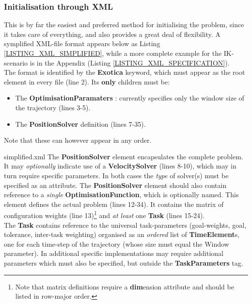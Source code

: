 \documentclass[12pt,a4paper,onecolumn]{article}
\begin{document}
\subsubsection*{Initialisation through XML}
This is by far the easiest and preferred method for initialising the problem, since it takes care of everything, and also provides a great deal of flexibility. A symplified XML-file format appears below as Listing \ref{LISTING_XML_SIMPLIFIED}, while a more complete example for the IK-scenario is in the Appendix (Listing \ref{LISTING_XML_SPECIFICATION}).\\
\newline
\noindent The format is identified by the \textbf{Exotica} keyword, which must appear as the root element in every file (line 2). Its \textbf{only} children must be:
\begin{itemize}
\item The \textbf{OptimisationParamaters} : currently specifies only the window size of the trajectory (lines 3-5).
\item The \textbf{PositionSolver} definition (lines 7-35).
\end{itemize}
Note that these can however appear in any order.

				{simplified.xml}
The \textbf{PositionSolver} element encapsulates the complete problem. It may \textit{optionally} indicate use of a \textbf{VelocitySolver} (lines 8-10), which may in turn require specific parameters. In both cases the \textit{type} of solver(s) must be specified as an attribute. The \textbf{PositionSolver} element should also contain reference to a \textit{single} \textbf{OptimisationFunction}, which is optionally named. This element defines the actual problem (lines 12-34). It contains the matrix of configuration weights (line 13)\footnote{Note that matrix definitions require a \textbf{dim}ension attribute and should be listed in row-major order.} and \textit{at least} one \textbf{Task} (lines 15-24).\\
\newline
\noindent The \textbf{Task} contains reference to the universal task-parameters (goal-weights, goal, tolerance, inter-task weighting) organised as an \textit{ordered} list of \textbf{TimeElement}s, one for each time-step of the trajectory (whose size must equal the Window parameter). In additional specific implementations may require additional parameters which must also be specified, but outside the \textbf{TaskParameters} tag.\\
\end{document}
